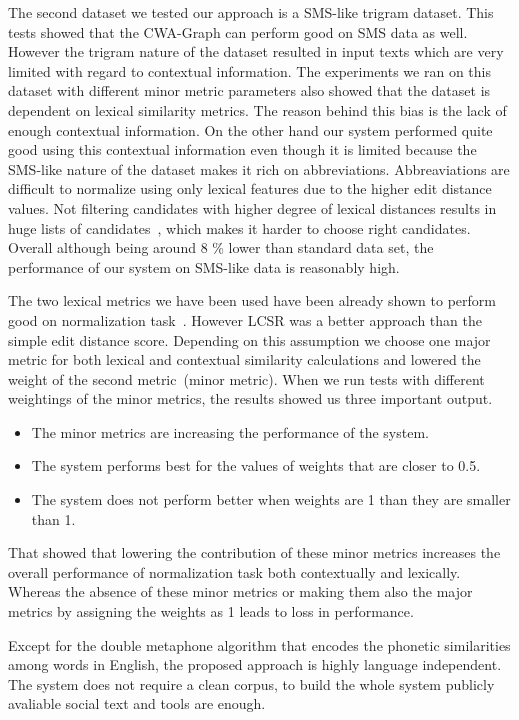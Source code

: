 \documentclass[a4paper,onesided,12pt]{report}
\begin{document}
The second dataset we tested our approach is a SMS-like trigram dataset. This tests showed that the CWA-Graph can perform good on SMS data as well. However the trigram nature of the dataset resulted in input texts which are very limited with regard to contextual information. The experiments we ran on this dataset with different minor metric parameters also showed that the dataset is dependent on lexical similarity metrics. The reason behind this bias is the lack of enough contextual information. On the other hand our system performed quite good using this contextual information even though it is limited because the SMS-like nature of the dataset makes it rich on abbreviations. Abbreaviations are difficult to normalize using only lexical features due to the higher edit distance values. Not filtering candidates with higher degree of lexical distances results in huge lists of candidates~\cite{Han:2011:LNS:2002472.2002520}, which makes it harder to choose right candidates. Overall although being around 8 \% lower than standard data set, the performance of our system on SMS-like data is reasonably high.

The two lexical metrics we have been used have been already shown to perform good on normalization task~\cite{Han:2011:LNS:2002472.2002520,DBLP:conf/acl/HassanM13}. However LCSR was a better approach than the simple edit distance score. Depending on this assumption we choose one major metric for both lexical and contextual similarity calculations and lowered the weight of the second metric~(minor metric). When we run tests with different weightings of the minor metrics, the results showed us three important output.
\begin{itemize}
\item The minor metrics are increasing the performance of the system.
\item The system performs best for the values of weights that are closer to 0.5.
\item The system does not perform better when weights are 1 than they are smaller than 1.
\end{itemize}

That showed that lowering the contribution of these minor metrics increases the overall performance of normalization task both contextually and lexically. Whereas the absence of these minor metrics or making them also the major metrics by assigning the weights as 1 leads to loss in performance.

Except for the double metaphone algorithm that encodes the phonetic similarities among words in English, the proposed approach is highly language independent. The system does not require a clean corpus, to build the whole system publicly avaliable social text and tools are enough.
\end{document}
